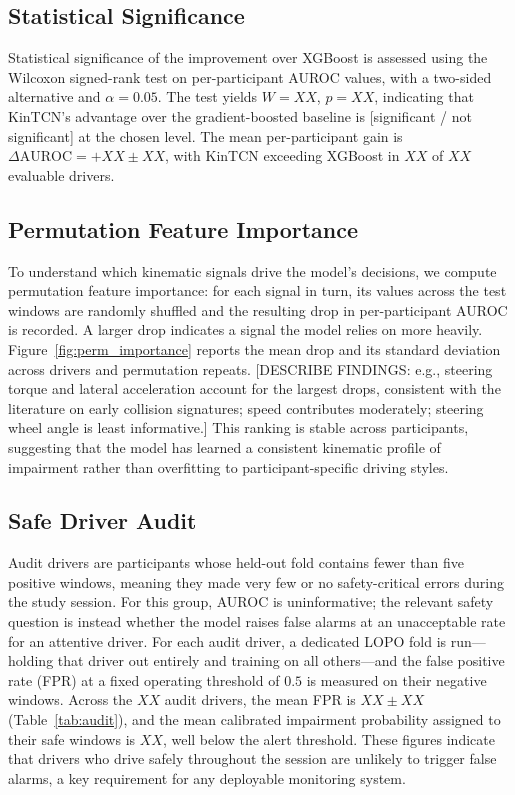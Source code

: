 \subsection{Statistical Significance}

Statistical significance of the improvement over XGBoost is assessed using the
Wilcoxon signed-rank test on per-participant AUROC values, with a two-sided
alternative and $\alpha = 0.05$.
The test yields $W = XX$, $p = XX$, indicating that KinTCN's advantage over
the gradient-boosted baseline is [significant / not significant] at the chosen
level.
The mean per-participant gain is $\Delta\mathrm{AUROC} = +XX \pm XX$,
with KinTCN exceeding XGBoost in $XX$ of $XX$ evaluable drivers.

\subsection{Permutation Feature Importance}

To understand which kinematic signals drive the model's decisions, we compute
permutation feature importance: for each signal in turn, its values across the
test windows are randomly shuffled and the resulting drop in per-participant
AUROC is recorded.
A larger drop indicates a signal the model relies on more heavily.
Figure~\ref{fig:perm_importance} reports the mean drop and its standard
deviation across drivers and permutation repeats.
[DESCRIBE FINDINGS: e.g., steering torque and lateral acceleration account for
the largest drops, consistent with the literature on early collision signatures;
speed contributes moderately; steering wheel angle is least informative.]
This ranking is stable across participants, suggesting that the model has
learned a consistent kinematic profile of impairment rather than overfitting
to participant-specific driving styles.

\subsection{Safe Driver Audit}
\label{sec:audit}

Audit drivers are participants whose held-out fold contains fewer than five
positive windows, meaning they made very few or no safety-critical errors
during the study session.
For this group, AUROC is uninformative; the relevant safety question is instead
whether the model raises false alarms at an unacceptable rate for an attentive
driver.
For each audit driver, a dedicated LOPO fold is run---holding that driver out
entirely and training on all others---and the false positive rate (FPR) at a
fixed operating threshold of $0.5$ is measured on their negative windows.
Across the $XX$ audit drivers, the mean FPR is $XX \pm XX$
(Table~\ref{tab:audit}), and the mean calibrated impairment probability
assigned to their safe windows is $XX$, well below the alert threshold.
These figures indicate that drivers who drive safely throughout the session are
unlikely to trigger false alarms, a key requirement for any deployable
monitoring system.

